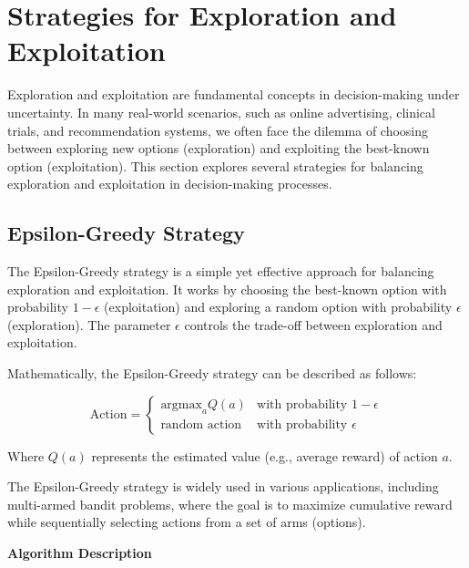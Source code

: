 \documentclass[12pt]{book} %
\begin{document}
\section{Strategies for Exploration and Exploitation}

Exploration and exploitation are fundamental concepts in decision-making under uncertainty. In many real-world scenarios, such as online advertising, clinical trials, and recommendation systems, we often face the dilemma of choosing between exploring new options (exploration) and exploiting the best-known option (exploitation). This section explores several strategies for balancing exploration and exploitation in decision-making processes.

\subsection{Epsilon-Greedy Strategy}

The Epsilon-Greedy strategy is a simple yet effective approach for balancing exploration and exploitation. It works by choosing the best-known option with probability \(1 - \epsilon\) (exploitation) and exploring a random option with probability \(\epsilon\) (exploration). The parameter \(\epsilon\) controls the trade-off between exploration and exploitation.

Mathematically, the Epsilon-Greedy strategy can be described as follows:

\begin{equation*}
\text{Action} =
\begin{cases}
\text{argmax}_{a} Q(a) & \text{with probability } 1 - \epsilon \\
\text{random action} & \text{with probability } \epsilon
\end{cases}
\end{equation*}

Where \(Q(a)\) represents the estimated value (e.g., average reward) of action \(a\).

The Epsilon-Greedy strategy is widely used in various applications, including multi-armed bandit problems, where the goal is to maximize cumulative reward while sequentially selecting actions from a set of arms (options).

\textbf{Algorithm Description}
\end{document}
